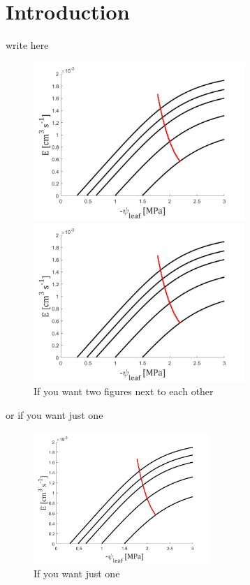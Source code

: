 \chapter{Introduction}\label{chapter:introduction}

\indent write here


\begin{figure}[h]
    \begin{minipage}{0.5\textwidth}
        \includegraphics[width=0.9\linewidth, height=6cm]{./img/1_intro/random_figure.jpg}
    \end{minipage}
    \hfill
    \begin{minipage}{0.5\textwidth}
        \includegraphics[width=1\linewidth, height=6cm]{./img/1_intro/random_figure.jpg}
    \end{minipage}
    \caption{If you want two figures next to each other}
    \label{Figure:conceptually}
\end{figure}

or if you want just one 

\begin{figure}[h]
    \centering
    \includegraphics[width=0.5\linewidth, height=5cm]{./img/1_intro/random_figure.jpg}
    \caption{If you want just one }
    \label{Figure:just one }
\end{figure}

